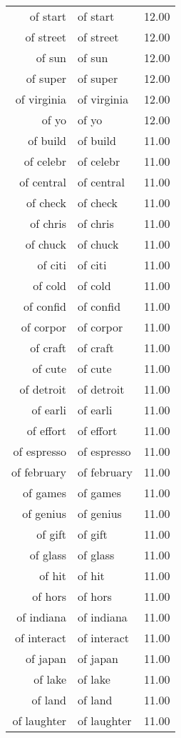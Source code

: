 \begin{table}[ht]
\begin{tabular}{rlr}
  of start & of start & 12.00 \\ 
  of street & of street & 12.00 \\ 
  of sun & of sun & 12.00 \\ 
  of super & of super & 12.00 \\ 
  of virginia & of virginia & 12.00 \\ 
  of yo & of yo & 12.00 \\ 
  of build & of build & 11.00 \\ 
  of celebr & of celebr & 11.00 \\ 
  of central & of central & 11.00 \\ 
  of check & of check & 11.00 \\ 
  of chris & of chris & 11.00 \\ 
  of chuck & of chuck & 11.00 \\ 
  of citi & of citi & 11.00 \\ 
  of cold & of cold & 11.00 \\ 
  of confid & of confid & 11.00 \\ 
  of corpor & of corpor & 11.00 \\ 
  of craft & of craft & 11.00 \\ 
  of cute & of cute & 11.00 \\ 
  of detroit & of detroit & 11.00 \\ 
  of earli & of earli & 11.00 \\ 
  of effort & of effort & 11.00 \\ 
  of espresso & of espresso & 11.00 \\ 
  of february & of february & 11.00 \\ 
  of games & of games & 11.00 \\ 
  of genius & of genius & 11.00 \\ 
  of gift & of gift & 11.00 \\ 
  of glass & of glass & 11.00 \\ 
  of hit & of hit & 11.00 \\ 
  of hors & of hors & 11.00 \\ 
  of indiana & of indiana & 11.00 \\ 
  of interact & of interact & 11.00 \\ 
  of japan & of japan & 11.00 \\ 
  of lake & of lake & 11.00 \\ 
  of land & of land & 11.00 \\ 
  of laughter & of laughter & 11.00 \\ 

\end{tabular}
\end{table}
